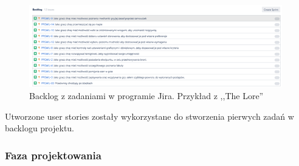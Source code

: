 \documentclass[oneside,polski,logo]{amuthesis}
\begin{document}
\begin{figure}[h]
	\centering
	\includegraphics[width=11cm]{images/hyps/backlog.png}
	\caption{Backlog z zadaniami w programie Jira. Przykład z ,,The Lore''}
\end{figure}

Utworzone user stories zostały wykorzystane do stworzenia pierwych zadań w backlogu projektu.\\ 

\subsubsection{Faza projektowania}
\end{document}
